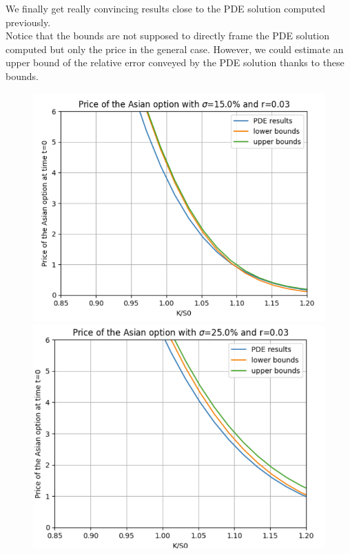 \documentclass{article}
\begin{document}
We finally get really convincing results close to the PDE solution computed previously.\\ 
Notice that the bounds are not supposed to directly frame the PDE solution computed but only the price in the general case. However, we could estimate an upper bound of the relative error conveyed by the PDE solution thanks to these bounds. \\
\begin{figure}[h]
  \centering
  \begin{minipage}{0.5\textwidth}
    \centering
    \includegraphics[width=\textwidth]{charts/Pric_bounds15.png}
    
  \end{minipage}\hfill
  \begin{minipage}{0.5\textwidth}
    \centering
    \includegraphics[width=\textwidth]{charts/Price_bounds25.png}
   
  \end{minipage}
\end{figure}
\end{document}
